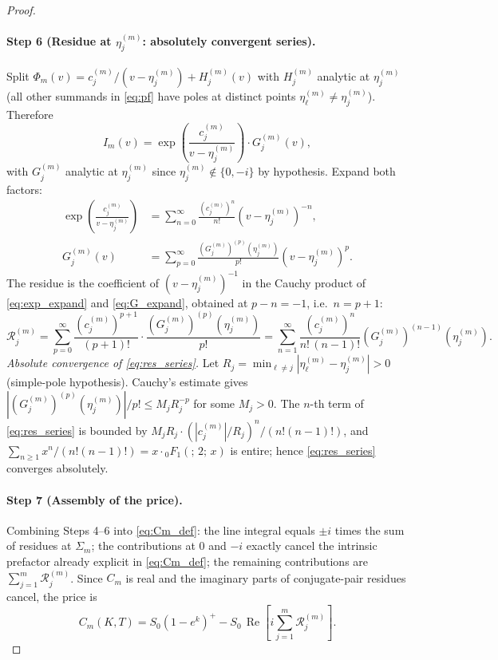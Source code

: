 \documentclass{article}
\newcommand{\cR}{\mathcal{R}}
\begin{document}
\begin{proof}
\paragraph{Step 6 (Residue at $\eta_j^{(m)}$: absolutely convergent
series).}
Split $\Phi_m(v) = c_j^{(m)}/(v - \eta_j^{(m)}) + H_j^{(m)}(v)$
with $H_j^{(m)}$ analytic at $\eta_j^{(m)}$ (all other summands in
\eqref{eq:pf} have poles at distinct points $\eta_\ell^{(m)}\ne\eta_j^{(m)}$).
Therefore
\begin{equation}\label{eq:Im_split}
  I_m(v) = \exp\!\left(\frac{c_j^{(m)}}{v-\eta_j^{(m)}}\right)
    \cdot G_j^{(m)}(v),
\end{equation}
with $G_j^{(m)}$ analytic at $\eta_j^{(m)}$ since
$\eta_j^{(m)}\notin\{0,-i\}$ by hypothesis.
Expand both factors:
\begin{align}
  \exp\!\left(\frac{c_j^{(m)}}{v-\eta_j^{(m)}}\right)
    &= \sum_{n=0}^{\infty}\frac{(c_j^{(m)})^n}{n!}
      (v-\eta_j^{(m)})^{-n},\label{eq:exp_expand}\\
  G_j^{(m)}(v)
    &= \sum_{p=0}^{\infty}
      \frac{(G_j^{(m)})^{(p)}(\eta_j^{(m)})}{p!}
      (v-\eta_j^{(m)})^p.\label{eq:G_expand}
\end{align}
The residue is the coefficient of $(v-\eta_j^{(m)})^{-1}$ in the
Cauchy product of \eqref{eq:exp_expand} and \eqref{eq:G_expand},
obtained at $p - n = -1$, i.e.\ $n = p + 1$:
\begin{equation}\label{eq:res_series}
  \cR_j^{(m)}
  = \sum_{p=0}^{\infty}
    \frac{(c_j^{(m)})^{p+1}}{(p+1)!}
    \cdot\frac{(G_j^{(m)})^{(p)}(\eta_j^{(m)})}{p!}
  = \sum_{n=1}^{\infty}\frac{(c_j^{(m)})^n}{n!\,(n-1)!}
    (G_j^{(m)})^{(n-1)}(\eta_j^{(m)}).\tag{4}
\end{equation}
\emph{Absolute convergence of \eqref{eq:res_series}.}
Let $R_j = \min_{\ell\ne j}|\eta_\ell^{(m)} - \eta_j^{(m)}| > 0$
(simple-pole hypothesis).  Cauchy's estimate gives
$|(G_j^{(m)})^{(p)}(\eta_j^{(m)})|/p! \le M_j R_j^{-p}$ for some
$M_j > 0$.  The $n$-th term of \eqref{eq:res_series} is bounded by
$M_j R_j \cdot (|c_j^{(m)}|/R_j)^n / (n!(n-1)!)$, and
$\sum_{n\ge 1} x^n/(n!(n-1)!) = x\cdot{}_0F_1(;\,2;\,x)$
is entire; hence \eqref{eq:res_series} converges absolutely.

\paragraph{Step 7 (Assembly of the price).}
Combining Steps 4--6 into \eqref{eq:Cm_def}: the line integral equals
$\pm i$ times the sum of residues at $\Sigma_m$; the contributions
at $0$ and $-i$ exactly cancel the intrinsic prefactor already
explicit in \eqref{eq:Cm_def}; the remaining contributions are
$\sum_{j=1}^m \cR_j^{(m)}$.  Since $C_m$ is real and the imaginary
parts of conjugate-pair residues cancel, the price is
\begin{equation}\label{eq:price_proof}
  C_m(K,T) = S_0(1-e^k)^+ - S_0\,\operatorname{Re}\!\left[
    i\sum_{j=1}^m \cR_j^{(m)}\right].
\end{equation}


\end{proof}
\end{document}
